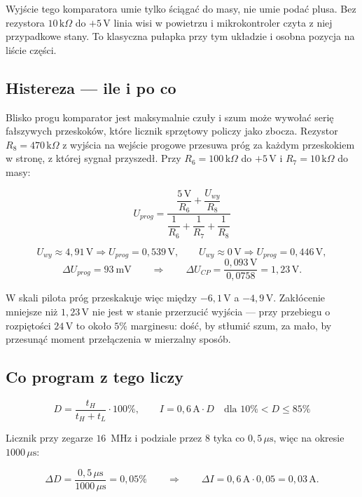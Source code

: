 \documentclass[a4paper,11pt]{article}
\newcommand{\kohm}{\,\mathrm{k}\Omega}
\newcommand{\volt}{\,\mathrm{V}}
\newcommand{\amp}{\,\mathrm{A}}
\newcommand{\us}{\,\mu\mathrm{s}}
\begin{document}
Wyjście tego komparatora umie tylko ściągać do masy, nie umie podać plusa. Bez
rezystora $10\kohm$ do $+5\volt$ linia wisi w powietrzu i mikrokontroler czyta z niej
przypadkowe stany. To klasyczna pułapka przy tym układzie i osobna pozycja na
liście części.

\subsection{Histereza --- ile i po co}

Blisko progu komparator jest maksymalnie czuły i szum może wywołać serię fałszywych
przeskoków, które licznik sprzętowy policzy jako zbocza. Rezystor $R_8=470\kohm$
z wyjścia na wejście progowe przesuwa próg za każdym przeskokiem w stronę, z której
sygnał przyszedł. Przy $R_6=100\kohm$ do $+5\volt$ i $R_7=10\kohm$ do masy:

\begin{equation}
U_{prog}=\frac{\dfrac{5\volt}{R_6}+\dfrac{U_{wy}}{R_8}}
              {\dfrac{1}{R_6}+\dfrac{1}{R_7}+\dfrac{1}{R_8}}
\label{eq:histereza}
\end{equation}

\[
U_{wy}\approx 4{,}91\volt \Rightarrow U_{prog}=0{,}539\volt,
\qquad
U_{wy}\approx 0\volt \Rightarrow U_{prog}=0{,}446\volt,
\]
\[
\Delta U_{prog}=93\ \mathrm{mV}
\qquad\Longrightarrow\qquad
\Delta U_{CP}=\frac{0{,}093\volt}{0{,}0758}=1{,}23\volt .
\]

W skali pilota próg przeskakuje więc między $-6{,}1\volt$ a $-4{,}9\volt$.
Zakłócenie mniejsze niż $1{,}23\volt$ nie jest w stanie przerzucić wyjścia --- przy
przebiegu o rozpiętości $24\volt$ to około $5\%$ marginesu: dość, by stłumić szum,
za mało, by przesunąć moment przełączenia w mierzalny sposób.

\subsection{Co program z tego liczy}

\begin{equation}
D=\frac{t_H}{t_H+t_L}\cdot100\%,
\qquad
I = 0{,}6\amp\cdot D \quad\text{dla } 10\% < D \le 85\%
\end{equation}

Licznik przy zegarze $16$~MHz i podziale przez $8$ tyka co $0{,}5\us$, więc na
okresie $1000\us$:

\[
\Delta D=\frac{0{,}5\us}{1000\us}=0{,}05\%
\qquad\Longrightarrow\qquad
\Delta I = 0{,}6\amp\cdot0{,}05=0{,}03\amp .
\]
\end{document}
